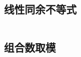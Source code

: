 \subsection{线性同余不等式}
\inputminted{cpp}{\source/number-theory/linear-inequaltion.cpp}
\subsection{组合数取模}
\inputminted{cpp}{\source/number-theory/module.cpp}
